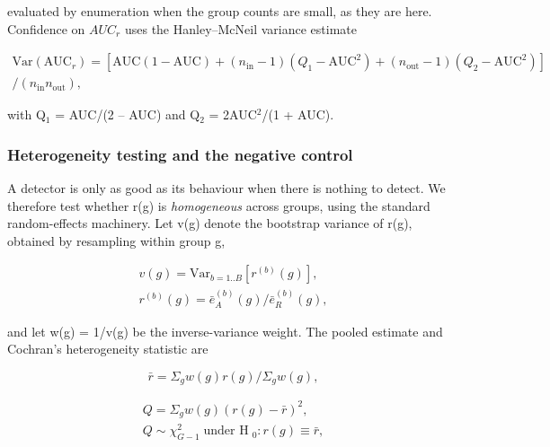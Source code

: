 evaluated by enumeration when the group counts are small, as they are here. Confidence on $AUC_{r}$ uses the Hanley--McNeil variance estimate 

\begin{equation}
\label{eq:50}
\begin{aligned}
\mathrm{Var}(\mathrm{AUC}_r) = [ \mathrm{AUC}(1-\mathrm{AUC}) + (n_{\mathrm{in}} - 1)(Q_{1} - \mathrm{AUC}^{2}) + (n_{\mathrm{out}} - 1)(Q_{2} - \mathrm{AUC}^{2}) ] \\ 
/ ( n_{\mathrm{in}} n_{\mathrm{out}} ),
\end{aligned}
\end{equation}

with Q$_{1}$ = AUC/(2 -- AUC) and Q$_{2}$ = 2AUC$^{2}$/(1 + AUC).

\subsubsection{Heterogeneity testing and the negative control}

A detector is only as good as its behaviour when there is nothing to detect. We therefore test whether r(g) is \emph{homogeneous} across groups, using the standard random-effects machinery. Let v(g) denote the bootstrap variance  of r(g), obtained by resampling within group g,

\begin{equation}
\label{eq:51}
\begin{aligned}
v(g) = \mathrm{Var}_{b=1..B} [ r^{(b)}(g) ], \\
r^{(b)}(g) = \bar{e}_A^{(b)}(g) / \bar{e}_R^{(b)}(g),
\end{aligned}
\end{equation}

and let w(g) = 1/v(g) be the inverse-variance weight. The pooled estimate and Cochran's heterogeneity statistic  are

\begin{equation}
\label{eq:52}
\bar{r} = \Sigma _g w(g) r(g) / \Sigma _g w(g),
\end{equation}

\begin{equation}
\label{eq:53}
\begin{aligned}
Q = \Sigma _g w(g) ( r(g) - \bar{r} )^{2} , \\
Q \sim \chi ^{2}_{G-1} \;\text{under H}\;_{0} : r(g) \equiv \bar{r} ,
\end{aligned}
\end{equation}

